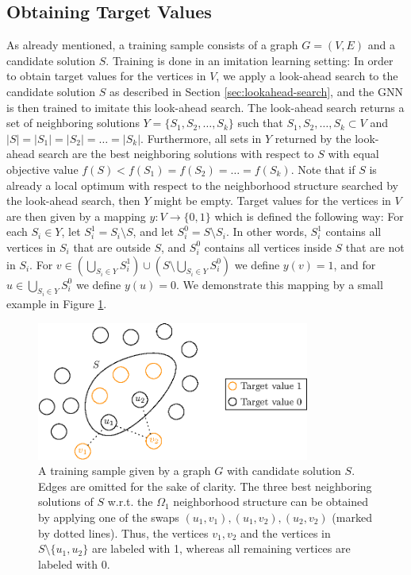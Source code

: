\documentclass[draft,final]{vutinfth} %
\begin{document}
\subsection{Obtaining Target Values}\label{subsec:target-values}
As already mentioned, a training sample consists of a graph $G = (V,E)$ and a candidate solution $S$. Training is done in an imitation learning setting: In order to obtain target values for the vertices in $V$, we apply a look-ahead search to the candidate solution $S$ as described in Section \ref{sec:lookahead-search}, and the GNN is then trained to imitate this look-ahead search. 
The look-ahead search returns a set of neighboring solutions $Y = \{S_1, S_2, \dots, S_k\}$ such that $S_1, S_2, \dots, S_k \subset V$ and $|S| = |S_1| = |S_2| = \dots = |S_k|$. Furthermore, all sets in $Y$ returned by the look-ahead search are the best neighboring solutions with respect to $S$ with equal objective value $f(S) < f(S_1) = f(S_2) = \dots = f(S_k)$. Note that if $S$ is already a local optimum with respect to the neighborhood structure searched by the look-ahead search, then $Y$ might be empty. Target values for the vertices in $V$ are then given by a mapping $y \colon V \rightarrow \{0,1\}$ which is defined the following way: For each $S_i \in Y$, let $S_{i}^1 = S_i \setminus S$, and let $S_{i}^0 = S \setminus S_i$. In other words, $S_i^1$ contains all vertices in $S_i$ that are outside $S$, and $S_i^0$ contains all vertices inside $S$ that are not in $S_i$. For $v \in (\bigcup_{S_i \in Y} S_i^1) \cup (S \setminus \bigcup_{S_i \in Y} S_i^0)$ we define $y(v) = 1$, and for $u \in \bigcup_{S_i \in Y} S_i^0$ we define $y(u) = 0 $. We demonstrate this mapping by a small example in Figure \ref{fig:target-values}. 

\begin{figure}
    \centering
    \includegraphics[width=0.8\textwidth]{graphics/target_values.eps}
    \caption[]{A training sample given by a graph $G$ with candidate solution $S$. Edges are omitted for the sake of clarity. The three best neighboring solutions of $S$ w.r.t. the $\Omega_1$ neighborhood structure can be obtained by applying one of the swaps $(u_1, v_1), (u_1, v_2), (u_2, v_2)$ (marked by dotted lines). Thus, the vertices $v_1, v_2$ and the vertices in $S \setminus \{u_1, u_2\}$ are labeled with 1, whereas all remaining vertices are labeled with 0. }
    \label{fig:target-values}
\end{figure}
\end{document}
